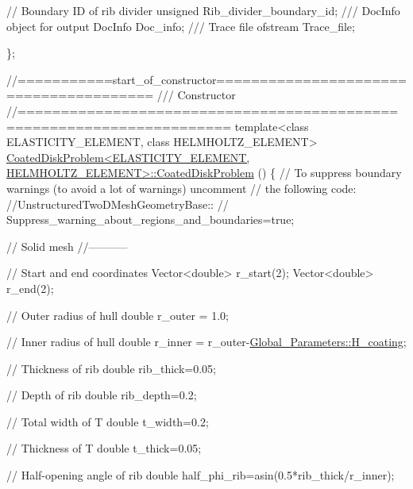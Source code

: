 \begin{DoxyCodeInclude}
 \textcolor{comment}{// Boundary ID of rib divider}
 \textcolor{keywordtype}{unsigned} Rib\_divider\_boundary\_id;
\textcolor{comment}{}
\textcolor{comment}{ /// DocInfo object for output}
\textcolor{comment}{} DocInfo Doc\_info;
\textcolor{comment}{}
\textcolor{comment}{ /// Trace file}
\textcolor{comment}{} ofstream Trace\_file;

\};


\textcolor{comment}{//===========start\_of\_constructor======================================= }\textcolor{comment}{}
\textcolor{comment}{/// Constructor}
\textcolor{comment}{}\textcolor{comment}{//====================================================================== }
\textcolor{keyword}{template}<\textcolor{keyword}{class} ELASTICITY\_ELEMENT, \textcolor{keyword}{class} HELMHOLTZ\_ELEMENT>
\hyperlink{classCoatedDiskProblem_a9585ca5b422c72dc2b91cbb3e311b736}{CoatedDiskProblem<ELASTICITY\_ELEMENT, HELMHOLTZ\_ELEMENT>::CoatedDiskProblem}
      () 
\{
 \textcolor{comment}{// To suppress boundary warnings (to avoid a lot of warnings) uncomment}
 \textcolor{comment}{// the following code:}
 \textcolor{comment}{//UnstructuredTwoDMeshGeometryBase::}
 \textcolor{comment}{// Suppress\_warning\_about\_regions\_and\_boundaries=true;}

 \textcolor{comment}{// Solid mesh}
 \textcolor{comment}{//-----------}

 \textcolor{comment}{// Start and end coordinates}
 Vector<double> r\_start(2);
 Vector<double> r\_end(2);
 
 \textcolor{comment}{// Outer radius of hull}
 \textcolor{keywordtype}{double} r\_outer = 1.0;

 \textcolor{comment}{// Inner radius of hull}
 \textcolor{keywordtype}{double} r\_inner = r\_outer-\hyperlink{namespaceGlobal__Parameters_ae3cf8878ede839bffda01f79bbe3e819}{Global\_Parameters::H\_coating};

 \textcolor{comment}{// Thickness of rib}
 \textcolor{keywordtype}{double} rib\_thick=0.05;
 
 \textcolor{comment}{// Depth of rib}
 \textcolor{keywordtype}{double} rib\_depth=0.2;

 \textcolor{comment}{// Total width of T}
 \textcolor{keywordtype}{double} t\_width=0.2;

 \textcolor{comment}{// Thickness of T}
 \textcolor{keywordtype}{double} t\_thick=0.05;

 \textcolor{comment}{// Half-opening angle of rib}
 \textcolor{keywordtype}{double} half\_phi\_rib=asin(0.5*rib\_thick/r\_inner);


\end{DoxyCodeInclude}

